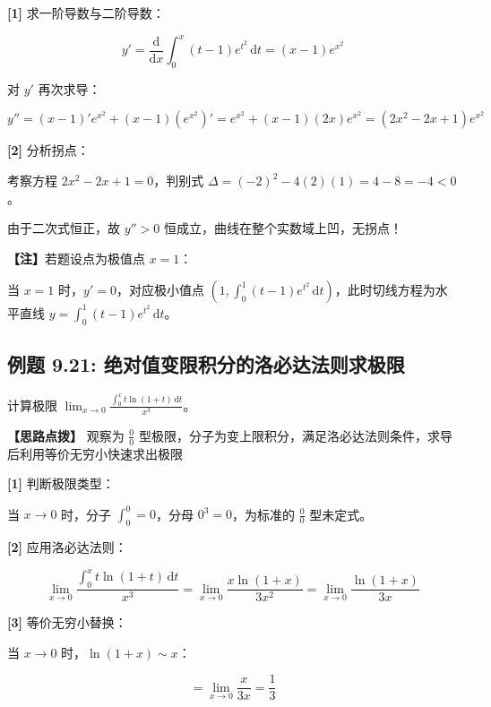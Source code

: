 \documentclass[11pt,a4paper,UTF8]{ctexart}
\begin{document}
\begin{solbox}[分步推导与答题规范]
\textbf{[1]} 求一阶导数与二阶导数：


\begin{equation*}
y' = \frac{\mathrm{d}}{\mathrm{d}x}\int_0^x (t-1)e^{t^2}\,\mathrm{d}t = (x-1)e^{x^2}
\end{equation*}


对 $y'$ 再次求导：


\begin{equation*}
y'' = (x-1)'e^{x^2} + (x-1)(e^{x^2})' = e^{x^2} + (x-1)(2x)e^{x^2} = (2x^2 - 2x + 1)e^{x^2}
\end{equation*}


\textbf{[2]} 分析拐点：

考察方程 $2x^2 - 2x + 1 = 0$，判别式 $\Delta = (-2)^2 - 4(2)(1) = 4 - 8 = -4 < 0$。

由于二次式恒正，故 $y'' > 0$ 恒成立，曲线在整个实数域上凹，无拐点！

\textbf{【注】}若题设点为极值点 $x=1$：

当 $x=1$ 时，$y' = 0$，对应极小值点 $(1, \int_0^1 (t-1)e^{t^2}\,\mathrm{d}t)$，此时切线方程为水平直线 $y = \int_0^1 (t-1)e^{t^2}\,\mathrm{d}t$。
\end{solbox}


\subsection{例题 9.21: 绝对值变限积分的洛必达法则求极限}

计算极限 $\lim_{x \to 0} \frac{\int_0^x t\ln(1+t)\,\mathrm{d}t}{x^3}$。

\textbf{\color{DeepPurple}【思路点拨】} 观察为 $\frac{0}{0}$ 型极限，分子为变上限积分，满足洛必达法则条件，求导后利用等价无穷小快速求出极限


\begin{solbox}[分步推导与答题规范]
\textbf{[1]} 判断极限类型：

当 $x \to 0$ 时，分子 $\int_0^0 = 0$，分母 $0^3 = 0$，为标准的 $\frac{0}{0}$ 型未定式。

\textbf{[2]} 应用洛必达法则：


\begin{equation*}
\lim_{x \to 0} \frac{\int_0^x t\ln(1+t)\,\mathrm{d}t}{x^3} = \lim_{x \to 0} \frac{x\ln(1+x)}{3x^2} = \lim_{x \to 0} \frac{\ln(1+x)}{3x}
\end{equation*}


\textbf{[3]} 等价无穷小替换：

当 $x \to 0$ 时，$\ln(1+x) \sim x$：


\begin{equation*}
= \lim_{x \to 0} \frac{x}{3x} = \frac{1}{3}
\end{equation*}

\end{solbox}
\end{document}
